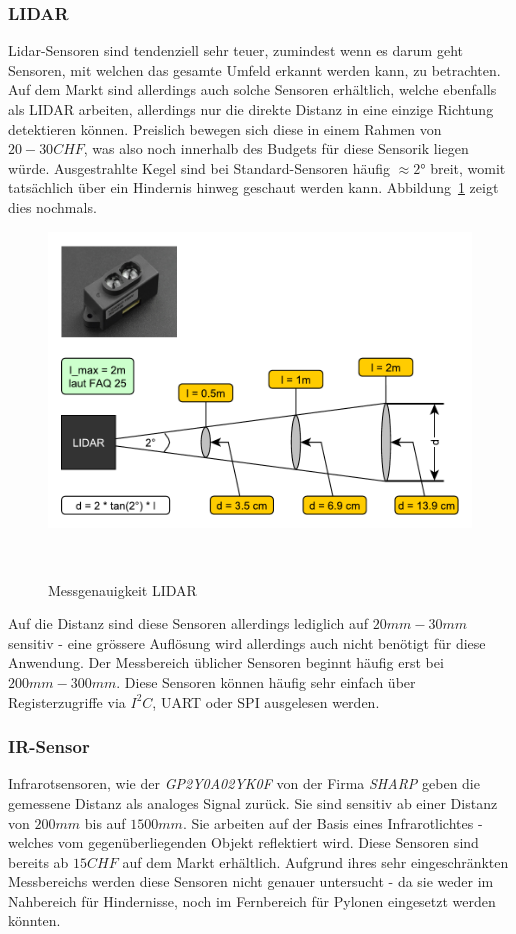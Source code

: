 \documentclass[main.tex]{subfiles} %
\begin{document}
\subsubsection*{LIDAR}
Lidar-Sensoren sind tendenziell sehr teuer, zumindest wenn es darum geht
Sensoren, mit welchen das gesamte Umfeld erkannt werden kann, zu betrachten.
Auf dem Markt sind allerdings auch solche Sensoren erhältlich, welche ebenfalls
als LIDAR arbeiten, allerdings nur die direkte Distanz in eine einzige Richtung
detektieren können. Preislich bewegen sich diese in einem Rahmen von $20 - 30
    CHF$, was also noch innerhalb des Budgets für diese Sensorik liegen würde.
Ausgestrahlte Kegel sind bei Standard-Sensoren häufig $\approx 2°$ breit,
womit tatsächlich über ein Hindernis hinweg geschaut werden kann.
Abbildung~\ref{fig:Genauigkeit_LIDAR} zeigt dies nochmals.

\begin{figure}[h!]
    \centering
    \includegraphics[width=0.75\linewidth]{./fig_Hinderniserkennung/Auslesegenauigkeit_LIDAR.pdf}
    \caption{Messgenauigkeit LIDAR}~\label{fig:Genauigkeit_LIDAR}
\end{figure}

Auf die Distanz sind diese Sensoren allerdings lediglich auf $20 mm - 30 mm$
sensitiv - eine grössere Auflösung wird allerdings auch nicht benötigt für
diese Anwendung. Der Messbereich üblicher Sensoren beginnt häufig erst bei $200
    mm - 300 mm$. Diese Sensoren können häufig sehr einfach über Registerzugriffe
via $I^2C$, UART oder SPI ausgelesen werden.

\subsubsection*{IR-Sensor}
Infrarotsensoren, wie der \textit{GP2Y0A02YK0F} von der Firma \textit{SHARP}
geben die gemessene Distanz als analoges Signal zurück. Sie sind sensitiv ab
einer Distanz von $200 mm$ bis auf $1500 mm$. Sie arbeiten auf der Basis eines
Infrarotlichtes - welches vom gegenüberliegenden Objekt reflektiert wird. Diese
Sensoren sind bereits ab $15 CHF$ auf dem Markt erhältlich. Aufgrund ihres sehr
eingeschränkten Messbereichs werden diese Sensoren nicht genauer untersucht -
da sie weder im Nahbereich für Hindernisse, noch im Fernbereich für Pylonen
eingesetzt werden könnten.
\end{document}
